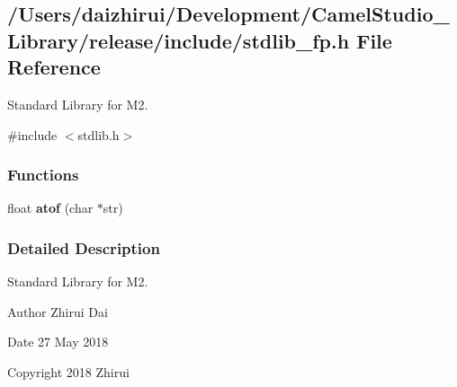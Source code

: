 \hypertarget{a00035}{}\subsection{/\+Users/daizhirui/\+Development/\+Camel\+Studio\+\_\+\+Library/release/include/stdlib\+\_\+fp.h File Reference}
\label{a00035}


Standard Library for M2.  


{\ttfamily \#include $<$stdlib.\+h$>$}\newline
\subsubsection*{Functions}
\begin{DoxyCompactItemize}
\item 
\mbox{\label{a00035_a40bb24dc7d4d98600cd976323cea17e0}} 
float {\bfseries atof} (char $\ast$str)
\end{DoxyCompactItemize}


\subsubsection{Detailed Description}
Standard Library for M2. 

\begin{DoxyAuthor}{Author}
Zhirui Dai 
\end{DoxyAuthor}
\begin{DoxyDate}{Date}
27 May 2018 
\end{DoxyDate}
\begin{DoxyCopyright}{Copyright}
2018 Zhirui 
\end{DoxyCopyright}
